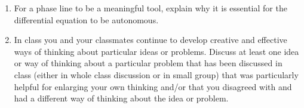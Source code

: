 \begin{enumerate}
\item For a phase line to be a meaningful tool, explain why it is essential for the differential equation to be autonomous. \label{04HWproblem5}

\item In class you and your classmates continue to develop creative and effective ways of thinking about particular ideas or problems. Discuss at least one idea or way of thinking about a particular problem that has been discussed in class (either in whole class discussion or in small group) that was particularly helpful for enlarging your own thinking and/or that you disagreed with and had a different way of thinking about the idea or problem. \label{04HWproblem6}

\end{enumerate}
